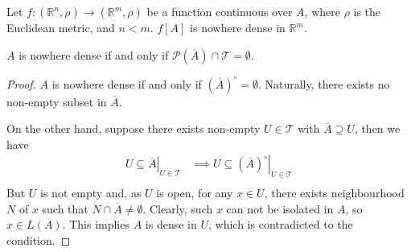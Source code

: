 \begin{example}
	Let $f:(\mathbb R^n, \rho) \to (\mathbb R^{m}, \rho)$ be a function continuous over $A$, where $\rho$ is the Euclidean metric, and $n < m$. $f[A]$ is nowhere dense in $\mathbb R^{m}$.
\end{example}


\begin{proposition}
	$A$ is nowhere dense if and only if $\mathcal P(\overline A) \cap \mathcal T = \emptyset$.
	
	\begin{proof}
		$A$ is nowhere dense if and only if $(\overline A)^\circ = \emptyset$. Naturally, there exists no non-empty subset in $\overline A$.
		
		On the other hand, suppose there exists non-empty $U \in \mathcal T$ with $\overline A \supseteq U$, then we have
		$$
		\begin{aligned}
			\left. U \subseteq \overline A \right|_{U \in \mathcal T} &\implies \left. U \subseteq (\overline A)^\circ \right|_{U \in \mathcal T} \\
		\end{aligned}
		$$
		But $U$ is not empty and, as $U$ is open, for any $x \in U$, there exists neighbourhood $N$ of $x$ such that $N \cap \overline A \ne \emptyset$. Clearly, such $x$ can not be isolated in $A$, so $x \in L(A)$. This implies $A$ is dense in $U$, which is contradicted to the condition.
	\end{proof}
\end{proposition}






















%